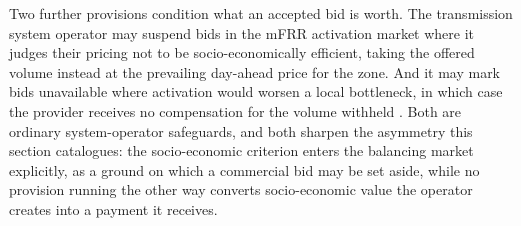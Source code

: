 Two further provisions condition what an accepted bid is worth. The transmission system operator may suspend bids in the mFRR activation market where it judges their pricing not to be socio-economically efficient, taking the offered volume instead at the prevailing day-ahead price for the zone. And it may mark bids unavailable where activation would worsen a local bottleneck, in which case the provider receives no compensation for the volume withheld \cite{statnett_forslag_2025}. Both are ordinary system-operator safeguards, and both sharpen the asymmetry this section catalogues: the socio-economic criterion enters the balancing market explicitly, as a ground on which a commercial bid may be set aside, while no provision running the other way converts socio-economic value the operator creates into a payment it receives.

